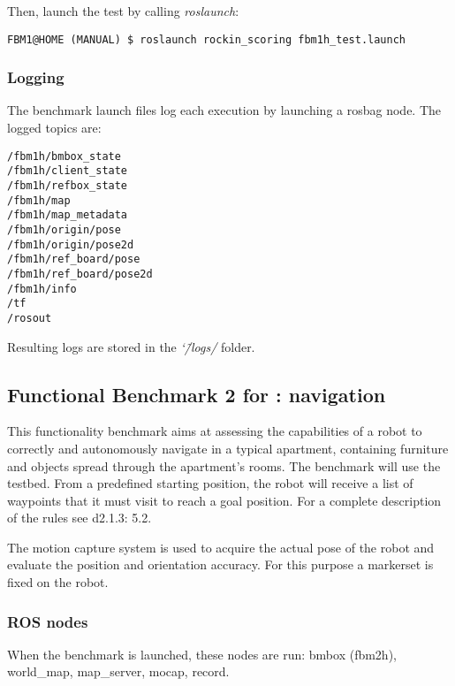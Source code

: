 \documentclass[a4paper]{article}
\newcommand{\logdir}{\char`\~/logs/}
\begin{document}
Then, launch the test by calling \emph{roslaunch}:
\begin{verbatim}
FBM1@HOME (MANUAL) $ roslaunch rockin_scoring fbm1h_test.launch
\end{verbatim}

\clearpage

\subsubsection{Logging}

The benchmark launch files log each execution by launching a rosbag node.
The logged topics are:

\begin{verbatim}
/fbm1h/bmbox_state
/fbm1h/client_state
/fbm1h/refbox_state
/fbm1h/map
/fbm1h/map_metadata
/fbm1h/origin/pose
/fbm1h/origin/pose2d
/fbm1h/ref_board/pose
/fbm1h/ref_board/pose2d
/fbm1h/info
/tf
/rosout
\end{verbatim}

Resulting logs are stored in the \emph{\logdir} folder.

\clearpage


\subsection{Functional Benchmark 2 for \ro@Home: navigation}
\label{sec:fbm2h}
This functionality benchmark aims at assessing the capabilities of a robot to correctly and autonomously navigate in a typical apartment, containing furniture and objects spread through the apartment’s rooms. The benchmark will use the \ro@Home testbed. From a predefined starting position, the robot will receive a list of waypoints that it must visit to reach a goal position.
For a complete description of the rules see d2.1.3: 5.2.

The motion capture system is used to acquire the actual pose of the robot and evaluate the position and orientation accuracy.
For this purpose a markerset is fixed on the robot.

\subsubsection{ROS nodes}

When the benchmark is launched, these nodes are run: bmbox (fbm2h), world_map, map_server, mocap, record.
\end{document}
